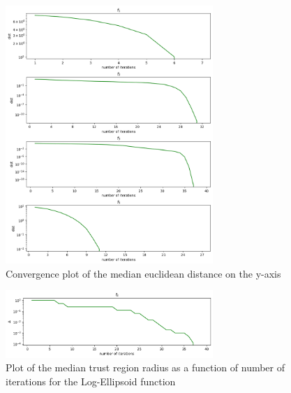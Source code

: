 \documentclass[a4paper]{article}
\begin{document}
\begin{figure}[H]
    \centering
    \includegraphics[width=0.7\textwidth]{plt_dist1000.png}
    \caption{Convergence plot of the median euclidean distance on the y-axis}
  \label{plt1}
\end{figure}

\begin{figure}[H]
    \centering
    \includegraphics[width=0.7\textwidth]{plt_radius1000.png}
    \caption{Plot of the median trust region radius as a function of number of
      iterations for the Log-Ellipsoid function}
    \label{plt3}
\end{figure}
\end{document}
